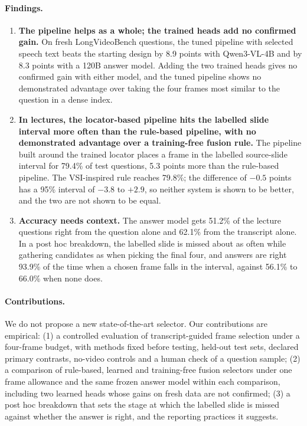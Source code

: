 \paragraph{Findings.}
\begin{enumerate}
\item \textbf{The pipeline helps as a whole; the trained heads add no confirmed gain.}
On fresh LongVideoBench questions, the tuned pipeline with selected speech text beats the starting design by 8.9 points with Qwen3-VL-4B and by 8.3 points with a 120B answer model.
Adding the two trained heads gives no confirmed gain with either model, and the tuned pipeline shows no demonstrated advantage over taking the four frames most similar to the question in a dense index.
\item \textbf{In lectures, the locator-based pipeline hits the labelled slide interval more often than the rule-based pipeline, with no demonstrated advantage over a training-free fusion rule.}
The pipeline built around the trained locator places a frame in the labelled source-slide interval for 79.4\% of test questions, 5.3 points more than the rule-based pipeline.
The VSI-inspired rule reaches 79.8\%; the difference of $-0.5$ points has a 95\% interval of $-3.8$ to $+2.9$, so neither system is shown to be better, and the two are not shown to be equal.
\item \textbf{Accuracy needs context.}
The answer model gets 51.2\% of the lecture questions right from the question alone and 62.1\% from the transcript alone.
In a post hoc breakdown, the labelled slide is missed about as often while gathering candidates as when picking the final four, and answers are right 93.9\% of the time when a chosen frame falls in the interval, against 56.1\% to 66.0\% when none does.
\end{enumerate}

\paragraph{Contributions.}
We do not propose a new state-of-the-art selector.
Our contributions are empirical:
(1) a controlled evaluation of transcript-guided frame selection under a four-frame budget, with methods fixed before testing, held-out test sets, declared primary contrasts, no-video controls and a human check of a question sample;
(2) a comparison of rule-based, learned and training-free fusion selectors under one frame allowance and the same frozen answer model within each comparison, including two learned heads whose gains on fresh data are not confirmed;
(3) a post hoc breakdown that sets the stage at which the labelled slide is missed against whether the answer is right, and the reporting practices it suggests.
